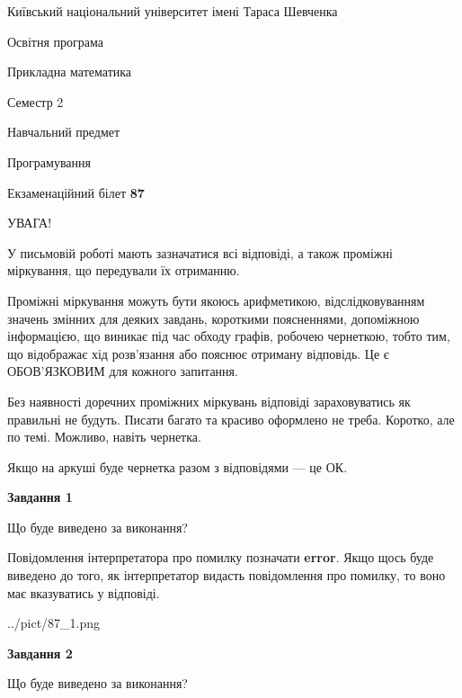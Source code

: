 \documentclass[12pt, ukrainian]{article}
\begin{document}
{{\begin {small}\par
{ \center  Київський національний університет імені Тараса Шевченка \par}
{\parbox {5 cm}{Освітня програма \hfill}{\parbox {7 cm}{Прикладна математика \hfill}}\parbox {6 cm}{\hfill Семестр 2}}\par
{\parbox {5 cm} {Навчальний предмет \hfill}\parbox {7 cm}{Програмування \hfill}\parbox {6cm}{\hfill}\par}\vspace{-7pt} \end{small}}{\center Екзаменаційний білет \No \textbf
{ 87 }\par}}
{
\begin {large}
УВАГА!

У письмовій роботі мають зазначатися всі відповіді, а також проміжні міркування, що передували їх отриманню.

Проміжні міркування можуть бути якоюсь арифметикою, відслідковуванням зна\-чень змінних для деяких завдань,
короткими поясненнями, допоміжною інформацією, що виникає під час обходу графів, робочею чернеткою,
тобто тим, що відображає хід розв’язання або пояснює отриману відповідь.
Це є ОБОВ’ЯЗКОВИМ для кожного запитання.

Без наявності доречних проміжних міркувань відповіді зараховуватись як правиль\-ні не будуть.
Писати багато та красиво оформлено не треба. Коротко, але по темі. Можли\-во, навіть чернетка.

Якщо на аркуші буде чернетка разом з відповідями --- це ОК.

\newpage

{\begin {center}\textbf{Завдання 1}\end {center}}\par
Що буде виведено за виконання?

Повідомлення інтерпретатора про помилку позначати \textbf{error}.
Якщо щось буде виведено до того, як інтерпретатор видасть повідомлення про помилку, 
то воно має вказуватись у відповіді. \par


\begin{center}
	{../pict/87_1.png}
\end{center}
\newpage

{\begin {center}\textbf{Завдання 2}\end {center}}\par
Що буде виведено за виконання?


\end{large}}
\end{document}
